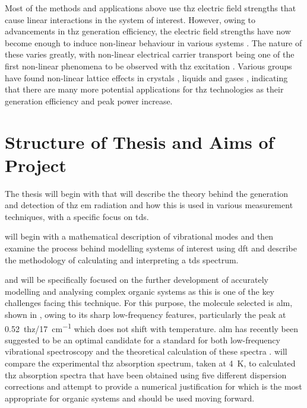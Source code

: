 Most of the methods and applications above use \acrshort{thz} electric field strengths that cause linear interactions in the system of interest. However, owing to advancements in \acrshort{thz} generation efficiency, the electric field strengths have now become enough to induce non\nobreakdash-linear behaviour in various systems \DIFdelbegin \DIFdel{~}\DIFdelend \cite{Hwang2015}. The nature of these varies greatly, with non\nobreakdash-linear electrical carrier transport being one of the first non\nobreakdash-linear phenomena to be observed with \acrshort{thz} excitation \DIFdelbegin \DIFdel{~}\DIFdelend \cite{Ganichev2005}. Various groups have found non\nobreakdash-linear lattice effects in crystals \DIFdelbegin \DIFdel{~}\DIFdelend \cite{Hwang2015}, liquids \DIFdelbegin \DIFdel{~}\DIFdelend \cite{Hoffmann2009} and gases \DIFdelbegin \DIFdel{~}\DIFdelend \cite{Fleischer2012}, indicating that there are many more potential applications for \acrshort{thz} technologies as their generation efficiency and peak power increase. 

\section{Structure of Thesis and Aims of Project}
The thesis will begin with  that will describe the theory behind the generation and detection of \acrshort{thz} \acrshort{em} radiation and how this is used in various measurement techniques, with a specific focus on \acrshort{tds}.

 will begin with a mathematical description of vibrational modes and then examine the process behind modelling systems of interest using \acrfull{dft} and describe the methodology of calculating and interpreting a \acrshort{tds} spectrum.

 and  will be specifically focused on the further development of accurately modelling and analysing complex organic systems as this is one of the key challenges facing this technique. For this purpose, the molecule selected is \acrfull{alm}, shown in , owing to its sharp low-frequency features, particularly the peak at \SI{0.52}{\acrshort{thz}}/\SI{17}{cm^{-1}} which does not shift with temperature. \acrshort{alm} has recently been suggested to be an optimal candidate for a standard for both low\nobreakdash-frequency vibrational spectroscopy and the theoretical calculation of these spectra \DIFdelbegin \DIFdel{~}\DIFdelend \cite{Dampf2020}.  will compare the experimental \acrshort{thz} absorption spectrum, taken at \SI{4}{K}, to calculated \acrshort{thz} absorption spectra that have been obtained using five different dispersion corrections and attempt to provide a numerical justification for which is the most appropriate for organic systems and should be used moving forward.

